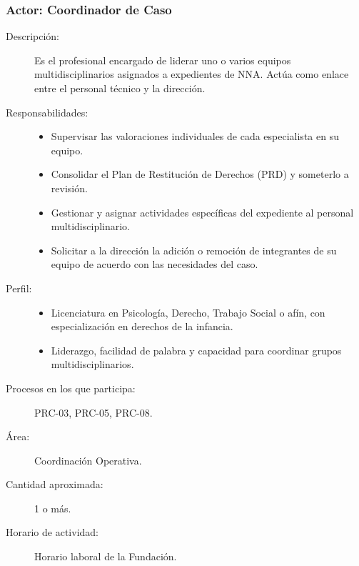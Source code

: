 \subsubsection{Actor: Coordinador de Caso}
\begin{description}
	\item[Descripción:] Es el profesional encargado de liderar uno o varios equipos multidisciplinarios asignados a expedientes de NNA. Actúa como enlace entre el personal técnico y la dirección.
	\item[Responsabilidades:] \cdtEmpty
	\begin{itemize}
		\item Supervisar las valoraciones individuales de cada especialista en su equipo.
		\item Consolidar el Plan de Restitución de Derechos (PRD) y someterlo a revisión.
		\item Gestionar y asignar actividades específicas del expediente al personal multidisciplinario.
		\item Solicitar a la dirección la adición o remoción de integrantes de su equipo de acuerdo con las necesidades del caso.
	\end{itemize}
	\item[Perfil:] \cdtEmpty
	\begin{itemize}
		\item Licenciatura en Psicología, Derecho, Trabajo Social o afín, con especialización en derechos de la infancia.
		\item Liderazgo, facilidad de palabra y capacidad para coordinar grupos multidisciplinarios.
	\end{itemize}
	\item[Procesos en los que participa:] PRC-03, PRC-05, PRC-08.
	\item[Área:] Coordinación Operativa.
	\item[Cantidad aproximada:] 1 o más.
	\item[Horario de actividad:] Horario laboral de la Fundación.
\end{description}

